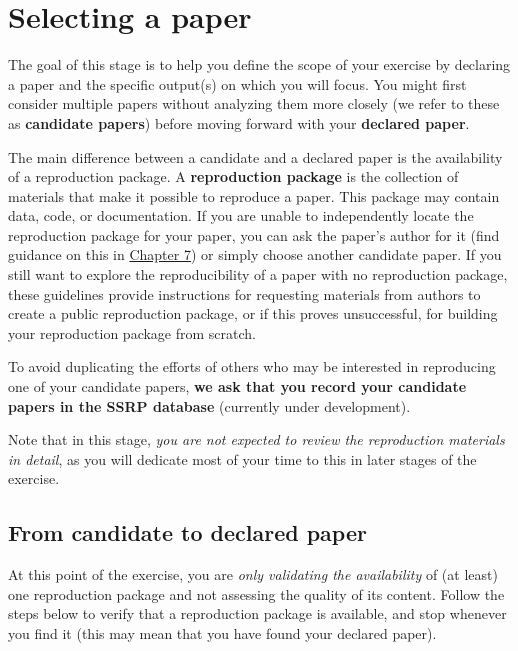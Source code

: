 \documentclass[
]{book}
\begin{document}
\hypertarget{select}{%
\chapter{Selecting a paper}\label{select}}

The goal of this stage is to help you define the scope of your exercise by declaring a paper and the specific output(s) on which you will focus. You might first consider multiple papers without analyzing them more closely (we refer to these as \textbf{candidate papers}) before moving forward with your \textbf{declared paper}.

The main difference between a candidate and a declared paper is the availability of a reproduction package. A \textbf{reproduction package} is the collection of materials that make it possible to reproduce a paper. This package may contain data, code, or documentation. If you are unable to independently locate the reproduction package for your paper, you can ask the paper's author for it (find guidance on this in \href{https://bitss.github.io/ACRE/guidance-for-a-constructive-exchange-between-reproducers-and-original-authors.html}{Chapter 7}) or simply choose another candidate paper. If you still want to explore the reproducibility of a paper with no reproduction package, these guidelines provide instructions for requesting materials from authors to create a public reproduction package, or if this proves unsuccessful, for building your reproduction package from scratch.

To avoid duplicating the efforts of others who may be interested in reproducing one of your candidate papers, \textbf{we ask that you record your candidate papers in the SSRP database} (currently under development).

Note that in this stage, \emph{you are not expected to review the reproduction materials in detail}, as you will dedicate most of your time to this in later stages of the exercise.

\hypertarget{declare}{%
\section{From candidate to declared paper}\label{declare}}

At this point of the exercise, you are \emph{only validating the availability} of (at least) one reproduction package and not assessing the quality of its content. Follow the steps below to verify that a reproduction package is available, and stop whenever you find it (this may mean that you have found your declared paper).
\end{document}
